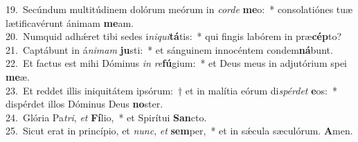 {19.~}Secúndum multitúdinem dolórum meórum in \textit{cor}\textit{de} \textbf{me}o:~* consolatiónes tuæ lætificavérunt ánimam \textbf{me}am.\\
{20.~}Numquid adhǽret tibi sedes i\textit{ni}\textit{qui}\textbf{tá}tis:~* qui fingis labórem in præ\textbf{cép}to?\\
{21.~}Captábunt in á\textit{ni}\textit{mam} \textbf{ju}sti:~* et sánguinem innocéntem condem\textbf{ná}bunt.\\
{22.~}Et factus est mihi Dóminus \textit{in} \textit{re}\textbf{fú}gium:~* et Deus meus in adjutórium spei \textbf{me}æ.\\
{23.~}Et reddet illis iniquitátem ipsórum:~† et in malítia eórum di\textit{spér}\textit{det} \textbf{e}os:~* dispérdet illos Dóminus Deus \textbf{no}ster.\\
{24.~}Glória Pa\textit{tri}, \textit{et} \textbf{Fí}lio,~* et Spirítui \textbf{San}cto.\\
{25.~}Sicut erat in princípio, et \textit{nunc}, \textit{et} \textbf{sem}per,~* et in sǽcula sæculórum. \textbf{A}men.\\
